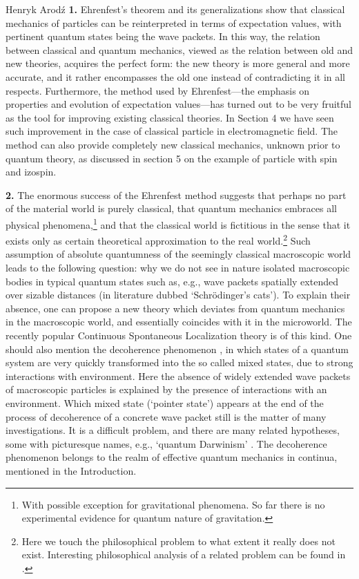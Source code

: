 \begin{artengenv}{Henryk Arod\'z}
{\bf 1.} Ehrenfest's theorem and its generalizations show that classical mechanics of particles can be reinterpreted in terms of expectation values, with pertinent quantum states being the wave packets. In this way, the relation between classical and quantum mechanics, viewed as the relation between old and new theories, acquires the perfect form: the new theory is more general and more accurate, and it rather encompasses the old one instead of contradicting it in all respects. Furthermore, the method used by Ehrenfest---the emphasis on properties and evolution of expectation values---has turned out to be very fruitful as the tool for improving existing classical theories. In Section 4 we have seen such improvement in the case of classical particle in electromagnetic field. The method can also provide completely new classical mechanics, unknown prior to quantum theory, as discussed in section 5 on the example of particle with spin and izospin. 




{\bf 2.} The enormous success of the Ehrenfest method suggests that perhaps no part of the material world is purely classical, that quantum mechanics embraces all physical phenomena,\footnote{With possible exception for gravitational phenomena. So far there is no experimental evidence for quantum nature of gravitation.} and that the classical world is fictitious in the sense that it exists only as certain theoretical approximation to the real world.\footnote{Here we touch the philosophical problem to what extent it really does not exist. Interesting philosophical analysis of a related problem can be found in \parencite{heller}.}
 Such assumption of absolute quantumness of the seemingly classical macroscopic world leads to the following question: why we do not see in nature isolated macroscopic bodies in typical quantum states such as, e.g., wave packets spatially extended over sizable distances (in literature dubbed `Schr\"odinger's cats'). To explain their absence, one can propose a new theory which deviates from quantum mechanics in the macroscopic world, and essentially coincides with it in the microworld. The recently popular Continuous Spontaneous Localization theory \parencite{CSL} is of this kind. 
 One should also mention 
the decoherence phenomenon \parencite{zeh,zurek}, in which states of a quantum system are very quickly transformed into the so called mixed states, due to strong interactions with environment. Here the absence of widely extended wave packets of macroscopic particles is explained by the presence of interactions with an environment. Which mixed state (`pointer state') appears at the end of the process of decoherence of a concrete wave packet still is the matter of many investigations. It is a difficult problem, and there are many related hypotheses, some with picturesque names, e.g., `quantum Darwinism' \parencite{zurek2}. The decoherence phenomenon belongs to the realm of effective quantum mechanics in continua, mentioned in the Introduction. 



\end{artengenv}
